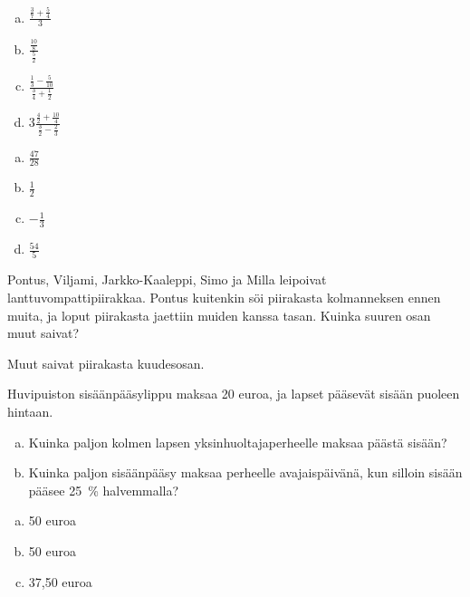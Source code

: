 \begin{tehtavasivu}
\begin{tehtava}
        \begin{enumerate}[a)]
        	\item $\displaystyle \frac{\frac{3}{7} + \frac{5}{4}}{3}$
        	\item $\displaystyle \frac{\frac{10}{8}}{\frac{5}{2}}$
        	\item $\displaystyle \frac{\frac{1}{3} - \frac{5}{10}}{\frac{3}{4} + \frac{1}{2}}$
        	\item $\displaystyle 3\frac{\frac{4}{2} + \frac{10}{4}}{\frac{3}{2} - \frac{2}{3}}$
        \end{enumerate}
            \begin{vastaus}		
        		\begin{enumerate}[a)]
        			\item $\frac{47}{28}$
        			\item $\frac{1}{2}$
        			\item $-\frac{1}{3}$
        			\item $\frac{54}{5}$
        		\end{enumerate}
            \end{vastaus}
        \end{tehtava}
    
    \begin{tehtava} %
        Pontus, Viljami, Jarkko-Kaaleppi, Simo ja Milla leipoivat lanttuvompattipiirakkaa.
        Pontus kuitenkin söi piirakasta kolmanneksen ennen muita, ja loput piirakasta
        jaettiin muiden kanssa tasan. Kuinka suuren osan muut saivat?
        
        \begin{vastaus}
            Muut saivat piirakasta kuudesosan.
        \end{vastaus}
    \end{tehtava}
    
    \begin{tehtava} %
        Huvipuiston sisäänpääsylippu maksaa 20 euroa, ja lapset pääsevät
        sisään puoleen hintaan.
	\begin{enumerate}[a)]
		\item Kuinka paljon kolmen lapsen yksinhuoltajaperheelle maksaa päästä sisään?
		\item Kuinka paljon sisäänpääsy maksaa perheelle avajaispäivänä,
		kun silloin sisään pääsee 25~\% halvemmalla?
        \end{enumerate}
        \begin{vastaus}
	\begin {enumerate}[a)]
         \item 50 euroa 
           \item 50 euroa 
	\item 37,50 euroa
\end{enumerate} 
       \end{vastaus}
    \end{tehtava}  
  

\end{tehtavasivu}
